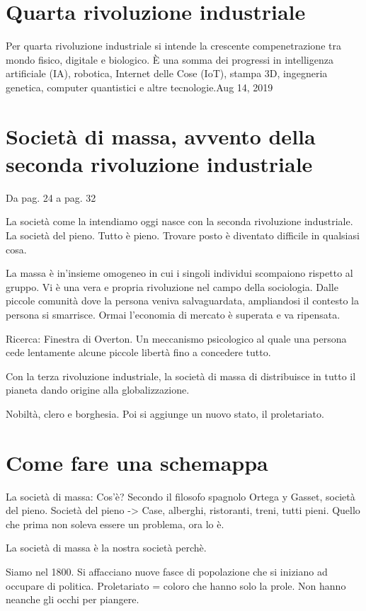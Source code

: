 \documentclass{article}
\begin{document}
    \section{Quarta rivoluzione industriale}
    Per quarta rivoluzione industriale si intende la crescente compenetrazione tra mondo fisico, digitale e biologico. È una somma dei progressi in intelligenza artificiale (IA), robotica, Internet delle Cose (IoT), stampa 3D, ingegneria genetica, computer quantistici e altre tecnologie.Aug 14, 2019

    \section{Società di massa, avvento della seconda rivoluzione industriale}
    Da pag. 24 a pag. 32

    La società come la intendiamo oggi nasce con la seconda rivoluzione industriale. La società del pieno. Tutto è pieno. Trovare posto è diventato difficile in qualsiasi cosa.

    La massa è in'insieme omogeneo in cui i singoli individui scompaiono rispetto al gruppo. Vi è una vera e propria rivoluzione nel campo della sociologia. Dalle piccole comunità dove la persona veniva salvaguardata, ampliandosi il contesto la persona si smarrisce.
    Ormai l'economia di mercato è superata e va ripensata.

    Ricerca: Finestra di Overton. Un meccanismo psicologico al quale una persona cede lentamente alcune piccole libertà fino a concedere tutto.

    Con la terza rivoluzione industriale, la società di massa di distribuisce in tutto il pianeta dando origine alla globalizzazione.

    Nobiltà, clero e borghesia. Poi si aggiunge un nuovo stato, il proletariato.

    \section{Come fare una schemappa}

    La società di massa:
    Cos'è? Secondo il filosofo spagnolo Ortega y Gasset, società del pieno.
    Società del pieno -> Case, alberghi, ristoranti, treni, tutti pieni. Quello che prima non soleva essere un problema, ora lo è.

    La società di massa è la nostra società perchè.

    Siamo nel 1800. Si affacciano nuove fasce di popolazione che si iniziano ad occupare di politica. Proletariato = coloro che hanno solo la prole. Non hanno neanche gli occhi per piangere. 
\end{document}
